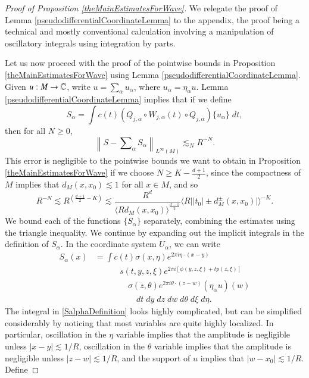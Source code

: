 \begin{proof}[Proof of Proposition \ref{theMainEstimatesForWave}]
We relegate the proof of Lemma \ref{pseudodifferentialCoordinateLemma} to the appendix, the proof being a technical and mostly conventional calculation involving a manipulation of oscillatory integrals using integration by parts.

Let us now proceed with the proof of the pointwise bounds in Proposition \ref{theMainEstimatesForWave} using Lemma \ref{pseudodifferentialCoordinateLemma}. Given $u: M \to \operatorname{\mathbb{C}}$, write $u = \sum_\alpha u_\alpha$, where $u_\alpha = \eta_\alpha u$. Lemma \ref{pseudodifferentialCoordinateLemma} implies that if we define
%
\begin{equation}
    S_\alpha = \int c(t) (Q_{j,\alpha} \circ W_{j,\alpha}(t) \circ Q_{j,\alpha}) \{ u_\alpha \}\; dt,
\end{equation}
%
then for all $N \geq 0$,
%
\begin{equation} \label{parametrixerrroestimate}
    \left\| S - \textstyle\sum\nolimits_\alpha S_\alpha \right\|_{L^\infty(M)} \lesssim_N R^{-N}.
\end{equation}
%
This error is negligible to the pointwise bounds we want to obtain in Proposition \ref{theMainEstimatesForWave} if we choose $N \geq K - \frac{d+1}{2}$, since the compactness of $M$ implies that $d_M(x,x_0) \lesssim 1$ for all $x \in M$, and so
%
\begin{equation}
    R^{-N} \lesssim R^{\left( \frac{d+1}{2} - K \right)} \lesssim \frac{R^{d}}{\langle R d_M(x,x_0) \rangle^{\frac{d-1}{2}}} \big\langle R \big| |t_0| \pm d_M^\pm(x,x_0) \big| \big\rangle^{-K}.
\end{equation}
%
We bound each of the functions $\{ S_\alpha \}$ separately, combining the estimates using the triangle inequality. We continue by expanding out the implicit integrals in the definition of $S_\alpha$. In the coordinate system $U_\alpha$, we can write
%
\begin{equation} \label{SalphaDefinition}
\begin{split}
    S_\alpha(x) &= \int c(t) \sigma(x,\eta) e^{2 \pi i \eta \cdot (x - y)}\\[-6 pt]
    &\quad\quad\quad s(t,y,z,\xi) e^{2 \pi i [ \phi(y,z,\xi) + t p(z,\xi) ]}\\
    &\quad\quad\quad\quad \sigma(z,\theta) e^{2 \pi i \theta \cdot (z - w)} (\eta_\alpha u)(w)\\
    &\quad\quad\quad\quad\quad dt\; dy\; dz\; dw\; d\theta\; d\xi\; d\eta.
\end{split}
\end{equation}
%
The integral in \eqref{SalphaDefinition} looks highly complicated, but can be simplified considerably by noticing that most variables are quite highly localized. In particular, oscillation in the $\eta$ variable implies that the amplitude is negligible unless $|x - y| \lesssim 1/R$, oscillation in the $\theta$ variable implies that the amplitude is negligible unless $|z - w| \lesssim 1/R$, and the support of $u$ implies that $|w - x_0| \lesssim 1/R$. Define

\end{proof}
